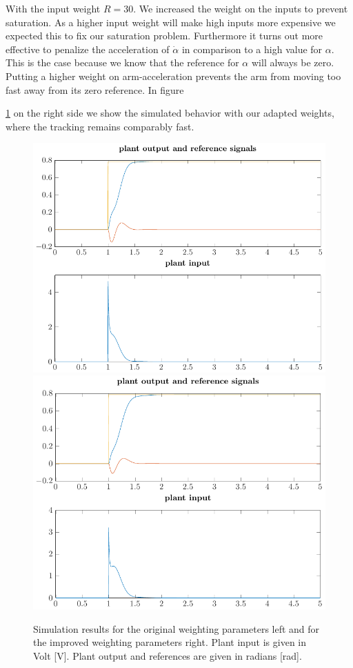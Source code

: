\documentclass[ twoside,openright,titlepage,numbers=noenddot,headinclude,%
                footinclude=true,cleardoublepage=empty,abstractoff, %
                BCOR=5mm,paper=a4,fontsize=11pt,%
                ngerman,american,%
                ]{scrreprt}
\begin{document}
With the input weight $R = 30$. We increased the weight on the inputs to prevent saturation. As a higher input weight will make high inputs more expensive we expected this to fix our saturation problem. Furthermore it turns out more effective to penalize the acceleration of $\dot{\alpha}$ in comparison to a high value for $\alpha$. This is the case because we know that the reference for $\alpha$ will always be zero. Putting a higher weight on arm-acceleration prevents the arm from moving too fast away from its zero reference. In figure~{\ref{fig:stepResponse} on the right side we show the simulated behavior with our adapted weights, where the tracking remains comparably fast. 


\begin{figure}
%
\includegraphics[scale=0.46]{images/orgFullState.pdf}
\includegraphics[scale=0.46]{images/optFullState.pdf}
\caption{Simulation results for the original weighting parameters left and for the improved weighting parameters right. Plant input is given in Volt [V]. Plant output and references are given in radians [rad].}
\label{fig:stepResponse}
\end{figure}


}
\end{document}
